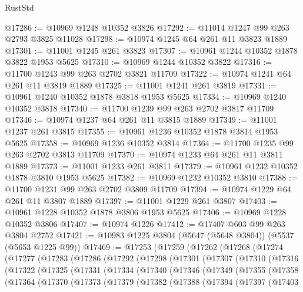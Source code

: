\begin{lexlean}{RustStd}
\begin{coremodule}
@17286 := @10969 @1248 @10352 @3826
@17292 := @11014 @1247 @99 @263 @2793 @3825 @11028
@17298 := @10974 @1245 @64 @261 @11 @3823 @1889
@17301 := @11001 @1245 @261 @3823
@17307 := @10961 @1244 @10352 @1878 @3822 @1953 @5625
@17310 := @10969 @1244 @10352 @3822
@17316 := @11700 @1243 @99 @263 @2702 @3821 @11709
@17322 := @10974 @1241 @64 @261 @11 @3819 @1889
@17325 := @11001 @1241 @261 @3819
@17331 := @10961 @1240 @10352 @1878 @3818 @1953 @5625
@17334 := @10969 @1240 @10352 @3818
@17340 := @11700 @1239 @99 @263 @2702 @3817 @11709
@17346 := @10974 @1237 @64 @261 @11 @3815 @1889
@17349 := @11001 @1237 @261 @3815
@17355 := @10961 @1236 @10352 @1878 @3814 @1953 @5625
@17358 := @10969 @1236 @10352 @3814
@17364 := @11700 @1235 @99 @263 @2702 @3813 @11709
@17370 := @10974 @1233 @64 @261 @11 @3811 @1889
@17373 := @11001 @1233 @261 @3811
@17379 := @10961 @1232 @10352 @1878 @3810 @1953 @5625
@17382 := @10969 @1232 @10352 @3810
@17388 := @11700 @1231 @99 @263 @2702 @3809 @11709
@17394 := @10974 @1229 @64 @261 @11 @3807 @1889
@17397 := @11001 @1229 @261 @3807
@17403 := @10961 @1228 @10352 @1878 @3806 @1953 @5625
@17406 := @10969 @1228 @10352 @3806
@17407 := @10974 @1226
@17412 := @17407 @603 @99 @263 @3804 @2752
@17421 := @10983 @1225 @3804 (@5647 (@5648 @3804)) (@5537 (@5653 @1225 @99))
@17469 := @17253
    (@17259
      (@17262
        (@17268
          (@17274
            (@17277
              (@17283
                (@17286
                  (@17292
                    (@17298
                      (@17301
                        (@17307
                          (@17310
                            (@17316
                              (@17322
                                (@17325
                                  (@17331
                                    (@17334
                                      (@17340
                                        (@17346
                                          (@17349
                                            (@17355
                                              (@17358
                                                (@17364
                                                  (@17370
                                                    (@17373
                                                      (@17379
                                                        (@17382
                                                          (@17388
                                                            (@17394
                                                              (@17397
                                                                (@17403

\end{coremodule}
\end{lexlean}
